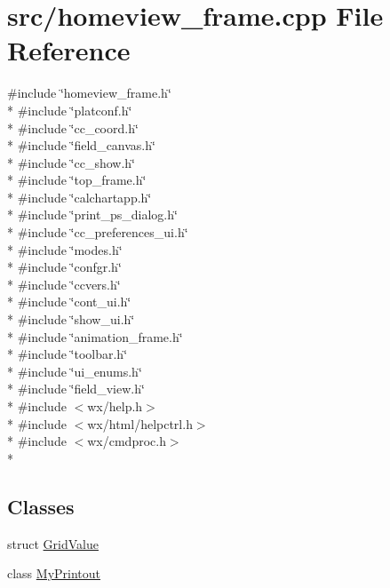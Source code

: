 \hypertarget{a00230}{\section{src/homeview\-\_\-frame.cpp File Reference}
\label{a00230}
}
{\ttfamily \#include \char`\"{}homeview\-\_\-frame.\-h\char`\"{}}\\*
{\ttfamily \#include \char`\"{}platconf.\-h\char`\"{}}\\*
{\ttfamily \#include \char`\"{}cc\-\_\-coord.\-h\char`\"{}}\\*
{\ttfamily \#include \char`\"{}field\-\_\-canvas.\-h\char`\"{}}\\*
{\ttfamily \#include \char`\"{}cc\-\_\-show.\-h\char`\"{}}\\*
{\ttfamily \#include \char`\"{}top\-\_\-frame.\-h\char`\"{}}\\*
{\ttfamily \#include \char`\"{}calchartapp.\-h\char`\"{}}\\*
{\ttfamily \#include \char`\"{}print\-\_\-ps\-\_\-dialog.\-h\char`\"{}}\\*
{\ttfamily \#include \char`\"{}cc\-\_\-preferences\-\_\-ui.\-h\char`\"{}}\\*
{\ttfamily \#include \char`\"{}modes.\-h\char`\"{}}\\*
{\ttfamily \#include \char`\"{}confgr.\-h\char`\"{}}\\*
{\ttfamily \#include \char`\"{}ccvers.\-h\char`\"{}}\\*
{\ttfamily \#include \char`\"{}cont\-\_\-ui.\-h\char`\"{}}\\*
{\ttfamily \#include \char`\"{}show\-\_\-ui.\-h\char`\"{}}\\*
{\ttfamily \#include \char`\"{}animation\-\_\-frame.\-h\char`\"{}}\\*
{\ttfamily \#include \char`\"{}toolbar.\-h\char`\"{}}\\*
{\ttfamily \#include \char`\"{}ui\-\_\-enums.\-h\char`\"{}}\\*
{\ttfamily \#include \char`\"{}field\-\_\-view.\-h\char`\"{}}\\*
{\ttfamily \#include $<$wx/help.\-h$>$}\\*
{\ttfamily \#include $<$wx/html/helpctrl.\-h$>$}\\*
{\ttfamily \#include $<$wx/cmdproc.\-h$>$}\\*
\subsection*{Classes}
\begin{DoxyCompactItemize}
\item 
struct \hyperlink{a00106}{Grid\-Value}
\item 
class \hyperlink{a00113}{My\-Printout}
\end{DoxyCompactItemize}

